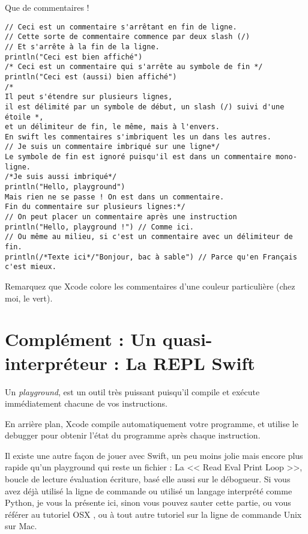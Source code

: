 \begin{listing}[H]
\caption{Que de commentaires !}
\begin{verbatim}
// Ceci est un commentaire s'arrêtant en fin de ligne.
// Cette sorte de commentaire commence par deux slash (/)
// Et s'arrête à la fin de la ligne.
println("Ceci est bien affiché")
/* Ceci est un commentaire qui s'arrête au symbole de fin */
println("Ceci est (aussi) bien affiché")
/*
Il peut s'étendre sur plusieurs lignes,
il est délimité par un symbole de début, un slash (/) suivi d'une étoile *,
et un délimiteur de fin, le même, mais à l'envers.
En swift les commentaires s'imbriquent les un dans les autres.
// Je suis un commentaire imbriqué sur une ligne*/
Le symbole de fin est ignoré puisqu'il est dans un commentaire mono-ligne.
/*Je suis aussi imbriqué*/
println("Hello, playground")
Mais rien ne se passe ! On est dans un commentaire.
Fin du commentaire sur plusieurs lignes:*/
// On peut placer un commentaire après une instruction
println("Hello, playground !") // Comme ici.
// Ou même au milieu, si c'est un commentaire avec un délimiteur de fin.
println(/*Texte ici*/"Bonjour, bac à sable") // Parce qu'en Français c'est mieux.
\end{verbatim}
\end{listing}
Remarquez que Xcode colore les commentaires d'une couleur particulière (chez moi, le vert).

\section{Complément : Un quasi-interpréteur : La REPL Swift}
Un \emph{playground}, est un outil très puissant
puisqu’il compile et exécute immédiatement
chacune de vos instructions.

En arrière plan, Xcode compile automatiquement votre programme,
et utilise le debugger pour obtenir l’état du programme après chaque instruction.

Il existe une autre façon de jouer avec Swift,
un peu moins jolie mais encore plus rapide qu’un playground
qui reste un fichier :
La << Read Eval Print Loop >>, boucle de lecture évaluation écriture,
basé elle aussi sur le débogueur.
Si vous avez déjà utilisé la ligne de commande
ou utilisé un langage interprété comme Python,
je vous la présente ici, sinon vous pouvez sauter cette partie,
ou vous référer au tutoriel OSX ,
ou à tout autre tutoriel sur la ligne de commande Unix sur Mac.

